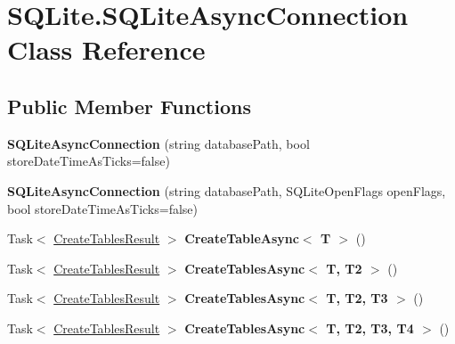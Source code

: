 \hypertarget{classSQLite_1_1SQLiteAsyncConnection}{\section{S\-Q\-Lite.\-S\-Q\-Lite\-Async\-Connection Class Reference}
\label{classSQLite_1_1SQLiteAsyncConnection}
}
\subsection*{Public Member Functions}
\begin{DoxyCompactItemize}
\item 
\hypertarget{classSQLite_1_1SQLiteAsyncConnection_a6b26a70d833ede366339dcdf0ac4ddec}{{\bfseries S\-Q\-Lite\-Async\-Connection} (string database\-Path, bool store\-Date\-Time\-As\-Ticks=false)}\label{classSQLite_1_1SQLiteAsyncConnection_a6b26a70d833ede366339dcdf0ac4ddec}

\item 
\hypertarget{classSQLite_1_1SQLiteAsyncConnection_abf2621d98094e8cc5702655eec267cec}{{\bfseries S\-Q\-Lite\-Async\-Connection} (string database\-Path, S\-Q\-Lite\-Open\-Flags open\-Flags, bool store\-Date\-Time\-As\-Ticks=false)}\label{classSQLite_1_1SQLiteAsyncConnection_abf2621d98094e8cc5702655eec267cec}

\item 
\hypertarget{classSQLite_1_1SQLiteAsyncConnection_a120dc02c80780a01f9158aa2dc4110e3}{Task$<$ \hyperlink{classSQLite_1_1CreateTablesResult}{Create\-Tables\-Result} $>$ {\bfseries Create\-Table\-Async$<$ T $>$} ()}\label{classSQLite_1_1SQLiteAsyncConnection_a120dc02c80780a01f9158aa2dc4110e3}

\item 
\hypertarget{classSQLite_1_1SQLiteAsyncConnection_a1911c2250387bf7db96a05d4ab73bfe7}{Task$<$ \hyperlink{classSQLite_1_1CreateTablesResult}{Create\-Tables\-Result} $>$ {\bfseries Create\-Tables\-Async$<$ T, T2 $>$} ()}\label{classSQLite_1_1SQLiteAsyncConnection_a1911c2250387bf7db96a05d4ab73bfe7}

\item 
\hypertarget{classSQLite_1_1SQLiteAsyncConnection_a0d18028757d84c1d5ef6b4f0a2f31bf8}{Task$<$ \hyperlink{classSQLite_1_1CreateTablesResult}{Create\-Tables\-Result} $>$ {\bfseries Create\-Tables\-Async$<$ T, T2, T3 $>$} ()}\label{classSQLite_1_1SQLiteAsyncConnection_a0d18028757d84c1d5ef6b4f0a2f31bf8}

\item 
\hypertarget{classSQLite_1_1SQLiteAsyncConnection_a36ed358566d4c64e0bf524c7d8c681a4}{Task$<$ \hyperlink{classSQLite_1_1CreateTablesResult}{Create\-Tables\-Result} $>$ {\bfseries Create\-Tables\-Async$<$ T, T2, T3, T4 $>$} ()}\label{classSQLite_1_1SQLiteAsyncConnection_a36ed358566d4c64e0bf524c7d8c681a4}


\end{DoxyCompactItemize}

